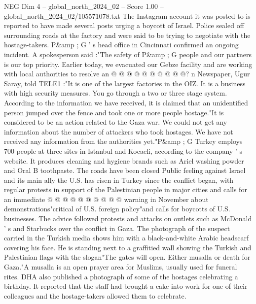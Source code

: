 \begin{textsample}{NEG Dim 4 – global\_north\_2024\_02 – Score 1.00 – global\_north\_2024\_02/105571078.txt}
The Instagram account it was posted to is reported to have made several posts urging a boycott of Israel.
Police sealed off surrounding roads at the factory and were said to be trying to negotiate with the hostage-takers.
P\&amp ; G ' s head office in Cincinnati confirmed an ongoing incident.
A spokesperson said :"The safety of P\&amp ; G people and our partners is our top priority.
Earlier today, we evacuated our Gebze facility and are working with local authorities to resolve an @ @ @ @ @ @ @ @ @ @? n Newspaper, Ugur Saray, told TELE1 :"It is one of the largest factories in the OIZ.
It is a business with high security measures.
You go through a two or three stage system.
According to the information we have received, it is claimed that an unidentified person jumped over the fence and took one or more people hostage."It is considered to be an action related to the Gaza war.
We could not get any information about the number of attackers who took hostages.
We have not received any information from the authorities yet."P\&amp ; G Turkey employs 700 people at three sites in Istanbul and Kocaeli, according to the company ' s website.
It produces cleaning and hygiene brands such as Ariel washing powder and Oral B toothpaste.
The roads have been closed Public feeling against Israel and its main ally the U.S. has risen in Turkey since the conflict began, with regular protests in support of the Palestinian people in major cities and calls for an immediate @ @ @ @ @ @ @ @ @ @ warning in November about demonstrations"critical of U.S. foreign policy"and calls for boycotts of U.S. businesses.
The advice followed protests and attacks on outlets such as McDonald ' s and Starbucks over the conflict in Gaza.
The photograph of the suspect carried in the Turkish media shows him with a black-and-white Arabic headscarf covering his face.
He is standing next to a graffitied wall showing the Turkish and Palestinian flags with the slogan"The gates will open.
Either musalla or death for Gaza."A musalla is an open prayer area for Muslims, usually used for funeral rites.
DHA also published a photograph of some of the hostages celebrating a birthday.
It reported that the staff had brought a cake into work for one of their colleagues and the hostage-takers allowed them to celebrate.

\end{textsample}
